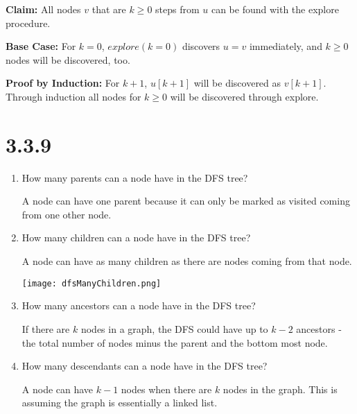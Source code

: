 \documentclass[12pt, letterpaper, twoside]{article}
\begin{document}
\textbf{Claim:} All nodes $v$ that are $k\ge0$ steps from $u$ can be found with the explore procedure.

\textbf{Base Case:} For $k=0$, $explore(k=0)$ discovers $u=v$ immediately, and $k\ge0$ nodes will be discovered, too.

\textbf{Proof by Induction:} For $k+1$, $u[k+1]$ will be discovered as $v[k+1]$. Through induction all nodes for $k\ge{0}$ will be discovered through explore.
\section*{3.3.9}
\begin{enumerate}
  \item How many parents can a node have in the DFS tree?
  
  A node can have one parent because it can only be marked as visited coming from one other node.
  
  \item How many children can a node have in the DFS tree?
  
  A node can have as many children as there are nodes coming from that node.
  
  \texttt{[image: dfsManyChildren.png]}

  \item How many ancestors can a node have in the DFS tree?
  
  If there are $k$ nodes in a graph, the DFS could have up to $k-2$ ancestors - the total number of nodes minus the parent and the bottom most node.

  \item How many descendants can a node have in the DFS tree?
  
  A node can have $k-1$ nodes when there are $k$ nodes in the graph. This is assuming the graph is essentially a linked list.

\end{enumerate}
\end{document}
